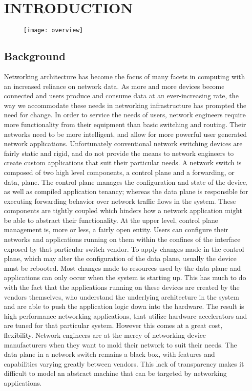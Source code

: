 \chapter{INTRODUCTION}
\label{intro}

\begin{figure}[h]
\centering
\texttt{[image: overview]}
\caption{}
\label{overview}
\end{figure}

\section{Background}
\label{intro:bg}
Networking architecture has become the focus of many facets in computing with
an increased reliance on network data. As more and more devices become
connected and users produce and consume data at an ever-increasing rate, the
way we accommodate these needs in networking infrastructure has prompted the
need for change. In order to service the needs of users, network engineers
require more functionality from their equipment than basic switching and
routing. Their networks need to be more intelligent, and allow for more
powerful user generated network applications. Unfortunately conventional
network switching devices are fairly static and rigid, and do not provide the
means to network engineers to create custom applications that suit their
particular needs. A network switch is composed of two high level components, a
control plane and a forwarding, or data, plane. The control plane manages the
configuration and state of the device, as well as compiled application
tenancy; whereas the data plane is responsible for executing forwarding
behavior over network traffic flows in the system. These components are
tightly coupled which hinders how a network application might be able to
abstract their functionality. At the upper level, control plane management is,
more or less, a fairly open entity. Users can configure their networks and
applications running on them within the confines of the interface exposed by
that particular switch vendor. To apply changes made in the control plane,
which may alter the configuration of the data plane, usually the device must
be rebooted. Most changes made to resources used by the data plane and
applications can only occur when the system is starting up. This has much to
do with the fact that the applications running on these devices are created by
the vendors themselves, who understand the underlying architecture in the
system and are able to push the application logic down into the hardware. The
result is high performance networking applications, that utilize hardware
accelerators and are tuned for that particular system. However this comes at a
great cost, flexibility. Network engineers are at the mercy of networking
device manufacturers when they want to mold their network to suit their needs.
The data plane in a network switch remains a black box, with features and
capabilities varying greatly between vendors. This lack of transparency makes
it difficult to model an abstract machine that can be targeted by networking
applications.

